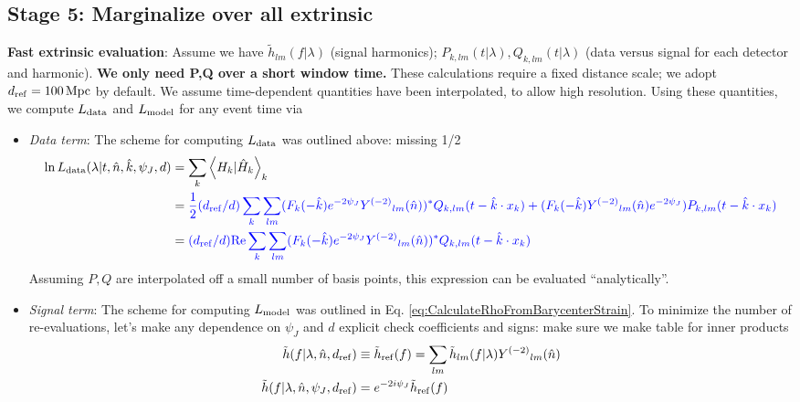 \documentclass[twocolumn,prd,nofootinbib]{revtex4}
\newcommand\editremark[1]{{\color{red} #1}}
\newcommand\unit[1]{\, {\rm #1}}
\newcommand\Y[1]{Y^{(#1)}{}}
\newcommand\qmstateproduct[2]{\left\langle#1|#2\right\rangle}
\begin{document}
\begin{widetext}
\subsection{Stage 5: Marginalize over all extrinsic }

\noindent \textbf{Fast extrinsic evaluation}: Assume we have $\tilde{h}_{lm}(f|\lambda)$ (signal harmonics);
$P_{k,lm}(t|\lambda),Q_{k,lm}(t|\lambda)$ (data versus signal for each detector and harmonic).  \textbf{We only need P,Q
  over a short window time.}  These calculations
require a fixed distance scale; we adopt $d_{\rm ref}=100\unit{Mpc}$ by default.  We assume time-dependent quantities
have been interpolated, to allow high resolution.  Using these quantities, we compute
$L_{\rm data}$ and $L_{\rm model}$ for any event time via
\begin{itemize}
\item \emph{Data term}:  The scheme for computing $L_{\rm data}$ was outlined above: \editremark{missing 1/2}
\begin{align}
\ln L_{\rm data}(\lambda|t,\hat{n},\hat{k},\psi_J,d) &=  \sum_k\qmstateproduct{H_k}{\hat{H}_k}_k \nonumber \\
& =
{\color{blue} \frac{1}{2} (d_{\rm ref}/d) \sum_k \sum_{lm}(F_k(-\hat{k}) e^{-2\psi_J} \Y{-2}_{lm}(\hat{n}))^* Q_{k,lm}(t-\hat{k}\cdot x_k)
   + (F_k(-\hat{k}) \Y{-2}_{lm}(\hat{n}) e^{-2\psi_J}) P_{k,lm}(t-\hat{k}\cdot x_k) 
} \nonumber \\
\label{eq:Implementation:lnLData}
&={\color{blue}  (d_{\rm ref}/d) \text{Re} \sum_k \sum_{lm}(F_k(-\hat{k}) e^{-2\psi_J} \Y{-2}_{lm}(\hat{n}))^* Q_{k,lm}(t-\hat{k}\cdot x_k)}
\end{align}
Assuming $P,Q$ are interpolated off a small number of basis points, this expression can be evaluated ``analytically''.
\item \emph{Signal term}:  The scheme for computing $L_{\rm model}$ was outlined in
  Eq. \ref{eq:CalculateRhoFromBarycenterStrain}.     To minimize the number of re-evaluations, let's make any dependence on
  $\psi_J$ and $d$ explicit
\editremark{check coefficients and signs: make sure we make table for inner products}
\begin{align}
\tilde{h}(f|\lambda,\hat{n},d_{\rm ref}) &\equiv \tilde{h}_{\rm ref}(f) = \sum_{lm} \tilde{h}_{lm}(f|\lambda) \Y{-2}_{lm}(\hat{n}) \\
\tilde{h}(f|\lambda,\hat{n},\psi_J,d_{\rm ref})&= e^{-2i\psi_J} \tilde{h}_{\rm ref}(f) \\

\end{align}
\end{itemize}
\end{widetext}
\end{document}
